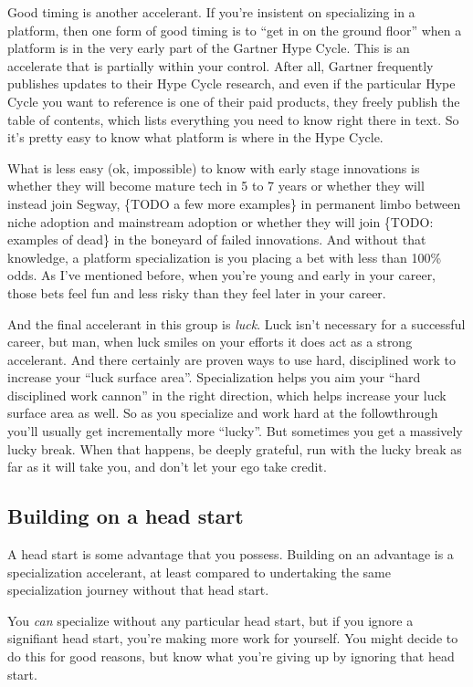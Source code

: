 Good timing is another accelerant. If you’re insistent on specializing in a platform, then one form of good timing is to “get in on the ground floor” when a platform is in the very early part of the Gartner Hype Cycle. This is an accelerate that is partially within your control. After all, Gartner frequently publishes updates to their Hype Cycle research, and even if the particular Hype Cycle you want to reference is one of their paid products, they freely publish the table of contents, which lists everything you need to know right there in text. So it’s pretty easy to know what platform is where in the Hype Cycle.

What is less easy (ok, impossible) to know with early stage innovations is whether they will become mature tech in 5 to 7 years or whether they will instead join Segway, \{TODO a few more examples\} in permanent limbo between niche adoption and mainstream adoption or whether they will join \{TODO: examples of dead\} in the boneyard of failed innovations. And without that knowledge, a platform specialization is you placing a bet with less than 100\% odds. As I’ve mentioned before, when you’re young and early in your career, those bets feel fun and less risky than they feel later in your career.

And the final accelerant in this group is \emph{luck}. Luck isn’t necessary for a successful career, but man, when luck smiles on your efforts it does act as a strong accelerant. And there certainly are proven ways to use hard, disciplined work to increase your “luck surface area”. Specialization helps you aim your “hard disciplined work cannon” in the right direction, which helps increase your luck surface area as well. So as you specialize and work hard at the followthrough you’ll usually get incrementally more “lucky”. But sometimes you get a massively lucky break. When that happens, be deeply grateful, run with the lucky break as far as it will take you, and don’t let your ego take credit.

\subsection{Building on a head start}

A head start is some advantage that you possess. Building on an advantage is a specialization accelerant, at least compared to undertaking the same specialization journey without that head start.

You \emph{can} specialize without any particular head start, but if you ignore a signifiant head start, you’re making more work for yourself. You might decide to do this for good reasons, but know what you’re giving up by ignoring that head start.

